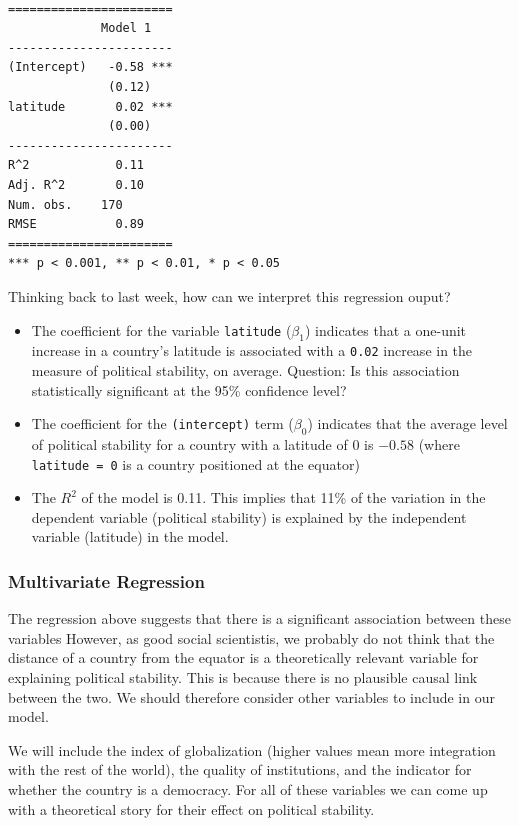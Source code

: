 \documentclass[]{article}
\providecommand{\tightlist}{%
  \setlength{\itemsep}{0pt}\setlength{\parskip}{0pt}}
\theoremstyle{definition}
\theoremstyle{definition}
\theoremstyle{definition}
\theoremstyle{remark}
\begin{document}
\begin{verbatim}

=======================
             Model 1   
-----------------------
(Intercept)   -0.58 ***
              (0.12)   
latitude       0.02 ***
              (0.00)   
-----------------------
R^2            0.11    
Adj. R^2       0.10    
Num. obs.    170       
RMSE           0.89    
=======================
*** p < 0.001, ** p < 0.01, * p < 0.05
\end{verbatim}

Thinking back to last week, how can we interpret this regression ouput?

\begin{itemize}
\tightlist
\item
  The coefficient for the variable \texttt{latitude} (\(\beta_1\))
  indicates that a one-unit increase in a country's latitude is
  associated with a \texttt{0.02} increase in the measure of political
  stability, on average. Question: Is this association statistically
  significant at the 95\% confidence level?
\item
  The coefficient for the \texttt{(intercept)} term (\(\beta_0\))
  indicates that the average level of political stability for a country
  with a latitude of 0 is \(-0.58\) (where \texttt{latitude\ =\ 0} is a
  country positioned at the equator)
\item
  The \(R^2\) of the model is 0.11. This implies that 11\% of the
  variation in the dependent variable (political stability) is explained
  by the independent variable (latitude) in the model.
\end{itemize}

\subsubsection{Multivariate Regression}\label{multivariate-regression}

The regression above suggests that there is a significant association
between these variables However, as good social scientistis, we probably
do not think that the distance of a country from the equator is a
theoretically relevant variable for explaining political stability. This
is because there is no plausible causal link between the two. We should
therefore consider other variables to include in our model.

We will include the index of globalization (higher values mean more
integration with the rest of the world), the quality of institutions,
and the indicator for whether the country is a democracy. For all of
these variables we can come up with a theoretical story for their effect
on political stability.
\end{document}
